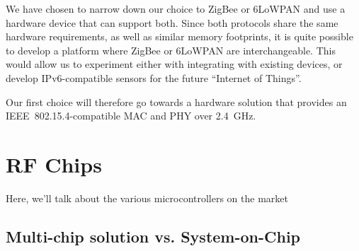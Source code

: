 \begin{table}[h]
    \myfloatalign
  \caption[Network stack summary]{Network stack summary}
  \label{tab:stack-comparison}
\end{table}


We have chosen to narrow down our choice to ZigBee or 6LoWPAN and use a hardware
device that can support both. Since both protocols share the same hardware
requirements, as well as similar memory footprints, it is quite possible to
develop a platform where ZigBee or 6LoWPAN are interchangeable. This would allow
us to experiment either with integrating with existing devices, or develop
IPv6-compatible sensors for the future ``Internet of Things''.

Our first choice will therefore go towards a hardware solution that provides an
IEEE~802.15.4-compatible MAC and PHY over \SI{2.4}{GHz}.

\section{RF Chips}\label{sec:chips}

Here, we'll talk about the various microcontrollers on the market

\subsection{Multi-chip solution vs. System-on-Chip}

